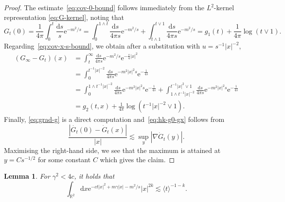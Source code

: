 \documentclass[11pt, a4paper]{scrartcl}
\numberwithin{equation}{section}
\theoremstyle{plain}
\newtheorem{lemma}[foo]{Lemma}
\theoremstyle{remark}
\newcommand{\mathd}{\mathrm{d}}
\newcommand{\mathe}{\mathrm{e}}
\begin{document}
\begin{proof}
	The estimate~\eqref{eq:cov-0-bound} follows immediately from the
	$L^2$-kernel representation \eqref{eq:G-kernel}, noting that
	\[ G_t (0) = \frac{1}{4\pi}\int_0^t \frac{\mathd s}{s} \mathe^{- m^2 / s} = \int_0^{1
			\wedge t} \frac{\mathd s}{4 \pi s} \mathe^{- m^2 / s} + \int_{t \wedge
			1}^{t \vee 1} \frac{\mathd s}{4 \pi s} \mathe^{- m^2 / s} = g_1 (t) +
		\frac{1}{4 \pi} \log (t \vee 1) . \]
	Regarding~\eqref{eq:cov-x-s-bound}, we obtain after a substitution with $u
		= s^{- 1} | x |^{- 2}$,
	\[ \begin{aligned}
			(G_{\infty} - G_t) (x) & = \int_t^{\infty}  \frac{\mathd s}{4 \pi s}
			\mathe^{- m^2 / s} \mathe^{- \frac{s}{4} | x |^2}                                           \\
			                       & = \int_0^{t^{- 1} | x |^{- 2}}  \frac{\mathd s}{4 \pi s} \mathe^{-
			m^2 | x |^2 s} \mathe^{- \frac{1}{4 s}}                                                     \\
			                       & = \int_0^{1 \wedge t^{- 1} | x |^{- 2}} \frac{\mathd s}{4 \pi s}
			\mathe^{- m^2 | x |^2 s} \mathe^{- \frac{1}{4 s}} + \int_{1 \wedge t^{-
						1} | x |^{- 2}}^{t^{- 1} | x |^2 \vee 1} \frac{\mathd s}{4 \pi s}
			\mathe^{- m^2 | x |^2 s} \mathe^{- \frac{1}{4 s}}                                           \\
			                       & = g_2 (t, x) + \frac{1}{4 \pi} \log (t^{- 1} | x |^{- 2} \vee 1) .
		\end{aligned} \]
	Finally, \eqref{eq:grad-g} is a direct computation and~\eqref{eq:hk-g0-gx}
	follows from
	\[ \frac{| \dot{G_t} (0) - \dot{G}_t (x) |}{| x |} \lesssim \sup_y  | \nabla
		\dot{G}_t (y) | . \]
	Maximising the right-hand side, we see that the maximum is attained at $y =
		Cs^{- 1 / 2}$ for some constant $C$ which gives the claim.
\end{proof}

\begin{lemma}
	\label{lem:exp-integrability}For $\gamma^2 < 4 c$, it holds that
	\[ \int_{\mathbb{R}^2} \mathd x \mathe^{- ct | x |^2 + m \gamma | x | - m^2
			/ s} | x |^{2 k} \lesssim \langle t \rangle^{- 1 - k} . \]
\end{lemma}
\end{document}
